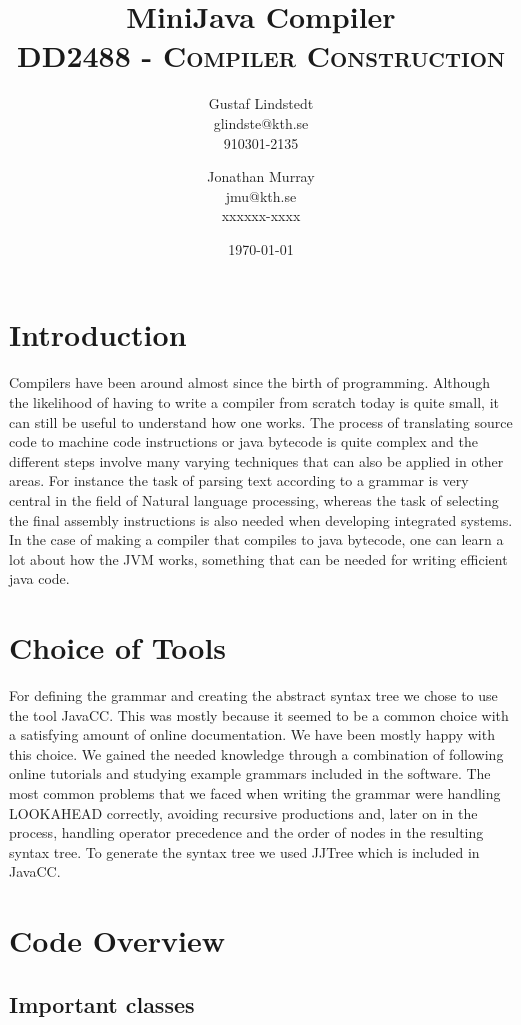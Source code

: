 \documentclass[paper=a4, fontsize=11pt]{scrartcl} %
\title{ 
\huge MiniJava Compiler \\ %
\vspace{10pt}
\normalfont \normalsize 
\textsc{DD2488 - Compiler Construction } \\ [25pt] %
}
\author{Gustaf Lindstedt \\ glindste@kth.se \\ 910301-2135 \and Jonathan Murray \\ jmu@kth.se \\ xxxxxx-xxxx}
\date{\vspace{8pt}\normalsize\today} %
\numberwithin{equation}{section} %
\numberwithin{figure}{section} %
\numberwithin{table}{section} %
\begin{document}
\maketitle

\section{Introduction}

Compilers have been around almost since the birth of programming.
Although the likelihood of having to write a compiler from scratch today is quite small, it can still be useful to understand how one works.
The process of translating source code to machine code instructions or java bytecode is quite complex and the different steps involve many varying techniques that can also be applied in other areas.
For instance the task of parsing text according to a grammar is very central in the field of Natural language processing, whereas the task of selecting the final assembly instructions is also needed when developing integrated systems.
In the case of making a compiler that compiles to java bytecode, one can learn a lot about how the JVM works, something that can be needed for writing efficient java code.

\section{Choice of Tools}

For defining the grammar and creating the abstract syntax tree we chose to use the tool JavaCC.
This was mostly because it seemed to be a common choice with a satisfying amount of online documentation.
We have been mostly happy with this choice.
We gained the needed knowledge through a combination of following online tutorials and studying example grammars included in the software.
The most common problems that we faced when writing the grammar were handling LOOKAHEAD correctly, avoiding recursive productions and, later on in the process, handling operator precedence and the order of nodes in the resulting syntax tree.
To generate the syntax tree we used JJTree which is included in JavaCC.

\section{Code Overview}

\subsection{Important classes}
\end{document}
